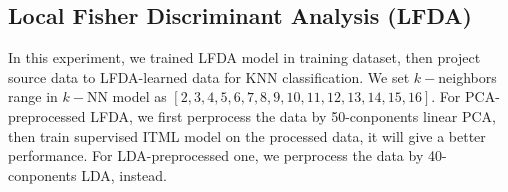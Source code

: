 \documentclass[conference]{IEEEtran}
\begin{document}
\subsection{Local Fisher Discriminant Analysis (LFDA)}


In this experiment, we trained LFDA model in training dataset, then project source data to LFDA-learned data for KNN classification. We set $k-$neighbors range in $k-$NN model as $[2, 3, 4, 5, 6, 7, 8, 9, 10, 11, 12, 13, 14, 15, 16]$. For PCA-preprocessed LFDA, we first perprocess the data by 50-conponents linear PCA, then train supervised ITML model on the processed data, it will give a better performance. For LDA-preprocessed one, we perprocess the data by 40-conponents LDA, instead.
\end{document}
